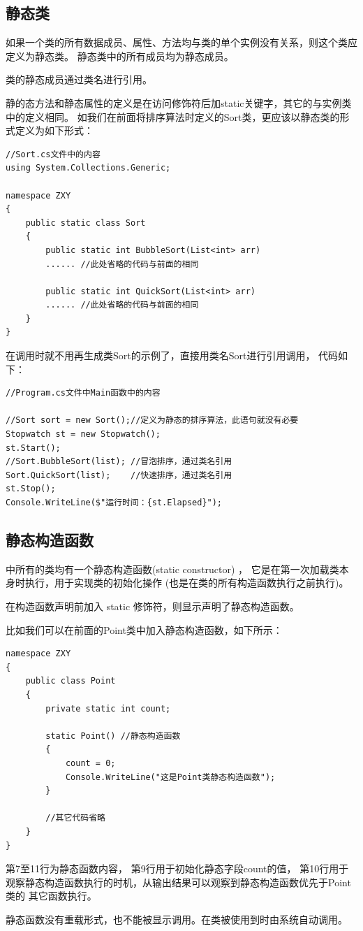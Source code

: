 \subsection{静态类}

如果一个类的所有数据成员、属性、方法均与类的单个实例没有关系，则这个类应定义为静态类。
静态类中的所有成员均为静态成员。

类的静态成员通过类名进行引用。

静的态方法和静态属性的定义是在访问修饰符后加static关键字，其它的与实例类中的定义相同。
如我们在前面将排序算法时定义的Sort类，更应该以静态类的形式定义为如下形式：
\begin{lstlisting}
//Sort.cs文件中的内容
using System.Collections.Generic;

namespace ZXY
{
    public static class Sort
    {
        public static int BubbleSort(List<int> arr)
        ...... //此处省略的代码与前面的相同

        public static int QuickSort(List<int> arr)
        ...... //此处省略的代码与前面的相同
    }
}
\end{lstlisting}

在调用时就不用再生成类Sort的示例了，直接用类名Sort进行引用调用，
代码如下：

\begin{lstlisting}
//Program.cs文件中Main函数中的内容

//Sort sort = new Sort();//定义为静态的排序算法，此语句就没有必要
Stopwatch st = new Stopwatch();
st.Start();
//Sort.BubbleSort(list); //冒泡排序，通过类名引用
Sort.QuickSort(list);    //快速排序，通过类名引用
st.Stop();
Console.WriteLine($"运行时间：{st.Elapsed}");
\end{lstlisting}



\subsection{静态构造函数}
\cs 中所有的类均有一个静态构造函数(static constructor) ，
它是在第一次加载类本身时执行，用于实现类的初始化操作
(也是在类的所有构造函数执行之前执行)。

在构造函数声明前加入 static 修饰符，则显示声明了静态构造函数。

比如我们可以在前面的Point类中加入静态构造函数，如下所示：

\begin{lstlisting}
namespace ZXY
{
    public class Point
    {
        private static int count;
            
        static Point() //静态构造函数
        {
            count = 0;
            Console.WriteLine("这是Point类静态构造函数");
        }

        //其它代码省略
    }
}
\end{lstlisting}

第7至11行为静态函数内容， 第9行用于初始化静态字段count的值，
第10行用于观察静态构造函数执行的时机，从输出结果可以观察到静态构造函数优先于Point类的
其它函数执行。

静态函数没有重载形式，也不能被显示调用。在类被使用到时由系统自动调用。





